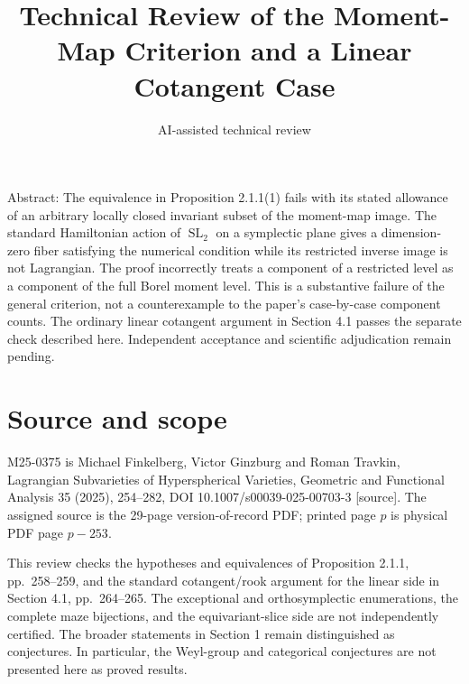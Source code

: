 \documentclass[10pt]{article}
\title{Technical Review of the Moment-Map Criterion and a Linear Cotangent Case}
\author{AI-assisted technical review}
\date{}
\begin{document}
\maketitle
Abstract: The equivalence in Proposition 2.1.1(1) fails with its stated allowance of an arbitrary locally closed invariant subset of the moment-map image. The standard Hamiltonian action of \(\operatorname{SL}_2\) on a symplectic plane gives a dimension-zero fiber satisfying the numerical condition while its restricted inverse image is not Lagrangian. The proof incorrectly treats a component of a restricted level as a component of the full Borel moment level. This is a substantive failure of the general criterion, not a counterexample to the paper’s case-by-case component counts. The ordinary linear cotangent argument in Section 4.1 passes the separate check described here. Independent acceptance and scientific adjudication remain pending.\par
\section*{Source and scope}
M25-0375 is Michael Finkelberg, Victor Ginzburg and Roman Travkin, Lagrangian Subvarieties of Hyperspherical Varieties, Geometric and Functional Analysis 35 (2025), 254–282, DOI 10.1007/s00039-025-00703-3 [source]. The assigned source is the 29-page version-of-record PDF; printed page \(p\) is physical PDF page \(p-253\).\par
This review checks the hypotheses and equivalences of Proposition 2.1.1, pp. 258–259, and the standard cotangent/rook argument for the linear side in Section 4.1, pp. 264–265. The exceptional and orthosymplectic enumerations, the complete maze bijections, and the equivariant-slice side are not independently certified. The broader statements in Section 1 remain distinguished as conjectures. In particular, the Weyl-group and categorical conjectures are not presented here as proved results.\par
\end{document}
